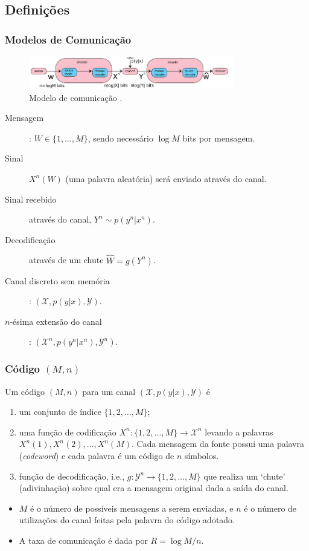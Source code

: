 \subsection{Definições}
\begin{frame}[allowframebreaks]
  \frametitle{Modelos de Comunicação}
                \begin{figure}[h!]
                \centering
                \includegraphics[width=0.8\textwidth]{images/modcom.pdf}
		\caption{Modelo de comunicação \citep{bilmes2013}.}
                \label{fig:modcomagain}
                \end{figure}
  \begin{description}
  \item[Mensagem] : $W \in \{1, \ldots, M\}$, sendo necessário $\log M$ bits por mensagem.
  \item[Sinal] $X^n(W)$ (uma palavra aleatória) será enviado através do canal.
  \item[Sinal recebido] através do canal, $Y^n \sim p(y^n|x^n)$.
  \item[Decodificação] através de um chute $\hat{W} = g(Y^n)$.
  \item[Canal discreto sem memória]: $(\mathcal{X}, p(y|x), \mathcal{Y})$.
  \item[$n$-ésima extensão do canal]: $(\mathcal{X}^n, p(y^n|x^n), \mathcal{Y}^n)$.
  \end{description}
\end{frame}

\begin{frame}[allowframebreaks]
  \frametitle{Código $(M,n)$}

  \begin{definition}[Código $(M,n)$]
  Um código $(M,n)$ para um canal $(\mathcal{X}, p(y|x), \mathcal{Y})$ é
  \begin{enumerate}
  \item um conjunto de índice $\{1,2,\ldots,M\}$;
  \item uma função de codificação $X^n : \{1,2,\ldots,M\} \rightarrow \mathcal{X}^n$ levando a palavras
	$X^n(1), X^n(2), \ldots, X^n(M)$. Cada mensagem da fonte possui uma palavra (\textit{codeword})
	e cada palavra é um código de $n$ símbolos.
  \item função de decodificação, i.e., $g: \mathcal{Y}^n \rightarrow \{1,2,\ldots,M\}$ que realiza
	um `chute' (adivinhação) sobre qual era a mensagem original dada a saída do canal.
  \end{enumerate}
  \end{definition}
  \begin{itemize}
  \item $M$ é o número de possíveis mensagens a serem enviadas, e $n$ é o número de utilizações do canal
	feitas pela palavra do código adotado.
  \item A taxa de comunicação é dada por $R = \log M / n$.
  \end{itemize}
\end{frame}

